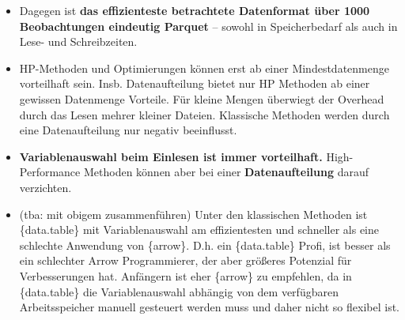 \documentclass[
  german,
  10pt,
  twoside]{article}
\providecommand{\tightlist}{%
  \setlength{\itemsep}{0pt}\setlength{\parskip}{0pt}}
\begin{document}
\begin{itemize}
\begin{itemize}
    \begin{itemize}
    \tightlist
    \item
      1e6: arrow \textgreater{} duckdb \textgreater{} DT+SEL
      \textgreater{} polars
    \item
      1e5: polars \textgreater{} duckdb \textgreater{} arrow
      \textgreater{} DT+SEL
    \item
      1e4: polars \textgreater{} data.table \textgreater{} arrow
      \textgreater{} readr
    \end{itemize}
  \item
    Unerwarteterweise ist \{polars\} bis 1\% BTP am schnellsten aber für
    das 10\% BTP abgeschlagen (unter den schlechtesten Methoden).
  \end{itemize}
\item
  Dagegen ist \textbf{das effizienteste betrachtete Datenformat über
  1000 Beobachtungen eindeutig Parquet} -- sowohl in Speicherbedarf als
  auch in Lese- und Schreibzeiten.
\item
  HP-Methoden und Optimierungen können erst ab einer Mindestdatenmenge
  vorteilhaft sein. Insb. Datenaufteilung bietet nur HP Methoden ab
  einer gewissen Datenmenge Vorteile. Für kleine Mengen überwiegt der
  Overhead durch das Lesen mehrer kleiner Dateien. Klassische Methoden
  werden durch eine Datenaufteilung nur negativ beeinflusst.
\item
  \textbf{Variablenauswahl beim Einlesen ist immer vorteilhaft.}
  High-Performance Methoden können aber bei einer
  \textbf{Datenaufteilung} darauf verzichten.
\item
  (tba: mit obigem zusammenführen) Unter den klassischen Methoden ist
  \{data.table\} mit Variablenauswahl am effizientesten und schneller
  als eine schlechte Anwendung von \{arrow\}. D.h. ein \{data.table\}
  Profi, ist besser als ein schlechter Arrow Programmierer, der aber
  größeres Potenzial für Verbesserungen hat. Anfängern ist eher
  \{arrow\} zu empfehlen, da in \{data.table\} die Variablenauswahl
  abhängig von dem verfügbaren Arbeitsspeicher manuell gesteuert werden
  muss und daher nicht so flexibel ist.


\end{itemize}
\end{document}
